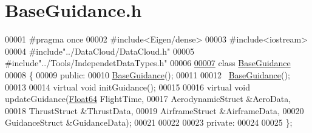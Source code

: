 \hypertarget{_base_guidance_8h_source}{}\section{Base\+Guidance.\+h}
\label{_base_guidance_8h_source}

\begin{DoxyCode}
00001 \textcolor{preprocessor}{#pragma once}
00002 \textcolor{preprocessor}{#include<Eigen/dense>}
00003 \textcolor{preprocessor}{#include<iostream>}
00004 \textcolor{preprocessor}{#include"../DataCloud/DataCloud.h"}
00005 \textcolor{preprocessor}{#include"../Tools/IndependetDataTypes.h"}
00006 
\hyperlink{class_base_guidance}{00007} \textcolor{keyword}{class }\hyperlink{class_base_guidance}{BaseGuidance} 
00008 \{
00009 \textcolor{keyword}{public}:
00010     \hyperlink{class_base_guidance}{BaseGuidance}();
00011 
00012     ~\hyperlink{class_base_guidance}{BaseGuidance}();
00013 
00014     \textcolor{keyword}{virtual} \textcolor{keywordtype}{void} initGuidance();
00015 
00016     \textcolor{keyword}{virtual} \textcolor{keywordtype}{void} updateGuidance(\hyperlink{group___tools_ga3f1431cb9f76da10f59246d1d743dc2c}{Float64} FlightTime,
00017                         AerodynamicStruct &AeroData,
00018                         ThrustStruct &ThrustData,
00019                         AirframeStruct &AirframeData,
00020                         GuidanceStruct &GuidanceData);
00021 
00022 
00023 \textcolor{keyword}{private}:
00024 
00025 \};
\end{DoxyCode}
